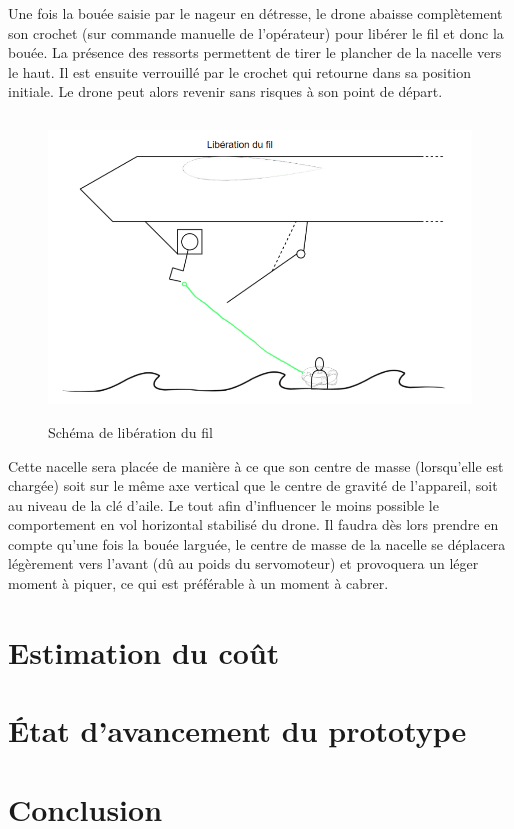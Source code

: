 \documentclass[a4paper,12pt,french]{report}
\begin{document}
Une fois la bouée saisie par le nageur en détresse, le drone abaisse complètement son crochet (sur commande manuelle de l’opérateur) pour libérer le fil et donc la bouée. La présence des ressorts permettent de tirer le plancher de la nacelle vers le haut. Il est ensuite verrouillé par le crochet qui retourne dans sa position initiale. Le drone peut alors revenir sans risques à son point de départ.\newline

\begin{figure}[h]
    \centering
    \includegraphics[height=8cm]{figures/b4.png}
    \caption{Schéma de libération du fil}
\end{figure}

Cette nacelle sera placée de manière à ce que son centre de masse (lorsqu’elle est chargée) soit sur le même axe vertical que le centre de gravité de l’appareil, soit au niveau de la clé d’aile. Le tout afin d’influencer le moins possible le comportement en vol horizontal stabilisé du drone. Il faudra dès lors prendre en compte qu’une fois la bouée larguée, le centre de masse de la nacelle se déplacera légèrement vers l’avant (dû au poids du servomoteur) et provoquera un léger moment à piquer, ce qui est préférable à un moment à cabrer.

\chapter{Estimation du coût}

\chapter{État d'avancement du prototype}

\chapter*{Conclusion}
\end{document}
